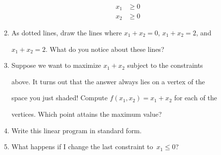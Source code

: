 \documentclass{article}
\begin{document}
\begin{multicols}{2}
\begin{enumerate}
\begin{align}
            x_1 &\geq 0\\

            x_2 &\geq 0

        \end{align}

    \item As dotted lines, draw the lines where $x_1+x_2=0$, $x_1+x_2=2$, and

        $x_1+x_2=2$.  What do you notice about these lines?

        \vspace{.75in}

    \item Suppose we want to maximize $x_1+x_2$ subject to the constraints

        above.  It turns out that the answer always lies on a vertex of the

        space you just shaded!  Compute $f(x_1,x_2)=x_1+x_2$ for each of the

        vertices. Which point attains the maximum value?

        \vspace{.75in}

    \item Write this linear program in standard form.\\

        \vspace{2in}

    \item What happens if I change the last constraint to~$x_1 \leq 0$?

\end{enumerate}



\end{multicols}
\end{document}
